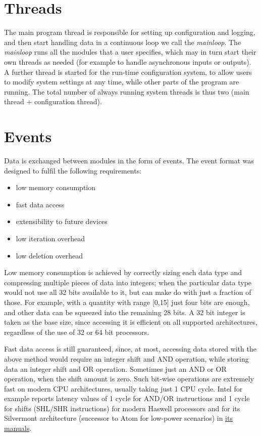 \documentclass[a4paper,12pt]{report}
\begin{document}
\section{Threads} \label{sec:threads}

The main program thread is responsible for setting up configuration and logging, and then start handling data in a continuous loop we call the \emph{mainloop}. The \emph{mainloop} runs all the modules that a user specifies, which may in turn start their own threads as needed (for example to handle asynchronous inputs or outputs).
A further thread is started for the run-time configuration system, to allow users to modify system settings at any time, while other parts of the program are running.
The total number of always running system threads is thus two (main thread + configuration thread).

\section{Events} \label{sec:events}

Data is exchanged between modules in the form of events.
The event format was designed to fulfil the following requirements:
\begin{itemize}
\item low memory consumption
\item fast data access
\item extensibility to future devices
\item low iteration overhead
\item low deletion overhead
\end{itemize}

Low memory consumption is achieved by correctly sizing each data type and compressing multiple pieces of data into integers; when the particular data type would not use all 32 bits available to it, but can make do with just a fraction of those. For example, with a quantity with range [0,15] just four bits are enough, and other data can be squeezed into the remaining 28 bits. A 32 bit integer is taken as the base size, since accessing it is efficient on all supported architectures, regardless of the use of 32 or 64 bit processors.

Fast data access is still guaranteed, since, at most, accessing data stored with the above method would require an integer shift and AND operation, while storing data an integer shift and OR operation. Sometimes just an AND or OR operation, when the shift amount is zero. Such bit-wise operations are extremely fast on modern CPU architectures, usually taking just 1 CPU cycle. Intel for example reports latency values of 1 cycle for AND/OR instructions and 1 cycle for shifts (SHL/SHR instructions) for modern Haswell processors and for its Silvermont architecture (successor to Atom for low-power scenarios) in \href{https://software.intel.com/en-us/articles/intel-sdm}{its manuals}.
\end{document}
